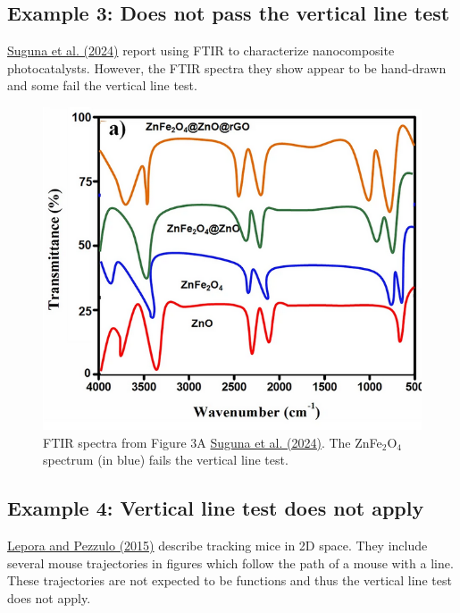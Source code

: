 \documentclass[letterpaper, 12pt]{article}
\begin{document}
\pagebreak

\subsection*{Example 3: Does not pass the vertical line test}

\href{https://doi.org/10.1007/s10854-024-13064-8}{Suguna et al. (2024)} report using FTIR to characterize nanocomposite photocatalysts. However, the FTIR spectra they show appear to be hand-drawn and some fail the vertical line test.

\begin{figure}[h!tbp]
    \centering
    \includegraphics[width=\textwidth]{img/vertical_line/suguna_ftir.png}
    \caption*{FTIR spectra from Figure 3A \href{https://doi.org/10.1007/s10854-024-13064-8}{Suguna et al. (2024)}. The ZnFe$_2$O$_4$ spectrum (in blue) fails the vertical line test.}
\end{figure}

\pagebreak

\subsection*{Example 4: Vertical line test does not apply}

\href{https://doi.org/10.1371/journal.pcbi.1004110}{Lepora and Pezzulo (2015)} describe tracking mice in 2D space. They include several mouse trajectories in figures which follow the path of a mouse with a line. These trajectories are not expected to be functions and thus the vertical line test does not apply.
\end{document}
